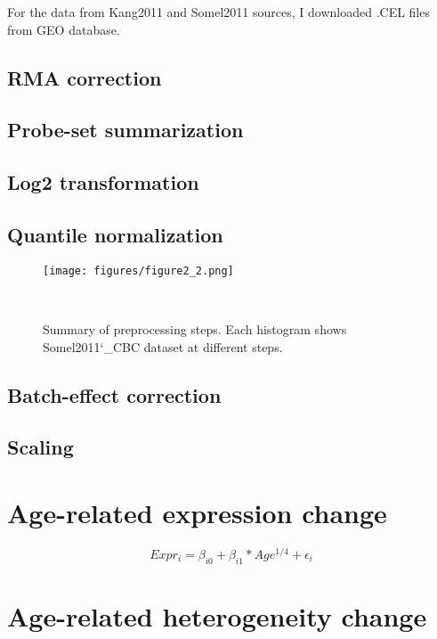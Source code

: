 For the data from Kang2011 and Somel2011 sources, I downloaded .CEL files from GEO database. 


\subsection{RMA correction}

\subsection{Probe-set summarization}

\subsection{Log2 transformation}

\subsection{Quantile normalization}

\begin{figure}[h]
\centering
\texttt{[image: figures/figure2\_2.png]}
\caption{Summary of preprocessing steps. Each histogram shows Somel2011\char`_CBC dataset at different steps.}~\label{fig:fig2.2}
\end{figure}

\subsection{Batch-effect correction}

\subsection{Scaling}

\section{Age-related expression change}

\begin{equation}
    Expr_i = \beta_{i0} + \beta_{i1} * Age^{1/4} + \epsilon_i
    \label{eq:exp_change}
\end{equation}

\section{Age-related heterogeneity change}


